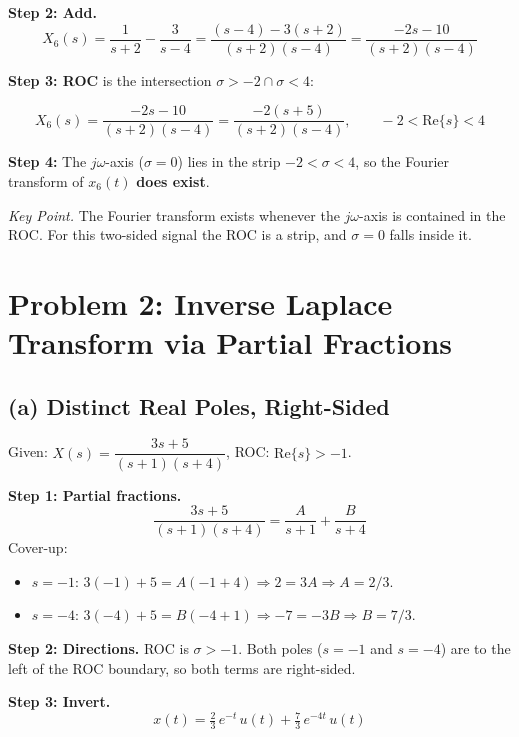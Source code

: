 \documentclass[11pt]{article}
\newcommand{\Res}{\mathrm{Re}}
\begin{document}
\textbf{Step 2: Add.}
\[
X_6(s) = \frac{1}{s+2} - \frac{3}{s-4}
= \frac{(s-4)-3(s+2)}{(s+2)(s-4)}
= \frac{-2s-10}{(s+2)(s-4)}
\]

\textbf{Step 3: ROC} is the intersection $\sigma > -2 \cap \sigma < 4$:

\begin{equation*}
\boxed{X_6(s) = \frac{-2s-10}{(s+2)(s-4)} = \frac{-2(s+5)}{(s+2)(s-4)}, \qquad -2 < \Res\{s\} < 4}
\end{equation*}

\textbf{Step 4:} The $j\omega$-axis ($\sigma=0$) lies in the strip $-2 < \sigma < 4$, so the
Fourier transform of $x_6(t)$ \textbf{does exist}.

\medskip
\noindent\textit{Key Point.} The Fourier transform exists whenever the $j\omega$-axis is contained in the
ROC. For this two-sided signal the ROC is a strip, and $\sigma = 0$ falls inside it.

\section*{Problem 2: Inverse Laplace Transform via Partial Fractions}

\subsection*{(a) Distinct Real Poles, Right-Sided}

Given: $X(s) = \dfrac{3s+5}{(s+1)(s+4)}$, ROC: $\Res\{s\} > -1$.

\textbf{Step 1: Partial fractions.}
\[
\frac{3s+5}{(s+1)(s+4)} = \frac{A}{s+1} + \frac{B}{s+4}
\]
Cover-up:
\begin{itemize}[leftmargin=2em]
\item $s=-1$: $3(-1)+5 = A(-1+4) \Rightarrow 2 = 3A \Rightarrow A = 2/3$.
\item $s=-4$: $3(-4)+5 = B(-4+1) \Rightarrow -7 = -3B \Rightarrow B = 7/3$.
\end{itemize}

\textbf{Step 2: Directions.} ROC is $\sigma > -1$. Both poles ($s=-1$ and $s=-4$) are to the
left of the ROC boundary, so both terms are right-sided.

\textbf{Step 3: Invert.}
\begin{equation*}
\boxed{x(t) = \tfrac{2}{3}\,e^{-t}\,u(t) + \tfrac{7}{3}\,e^{-4t}\,u(t)}
\end{equation*}
\end{document}
